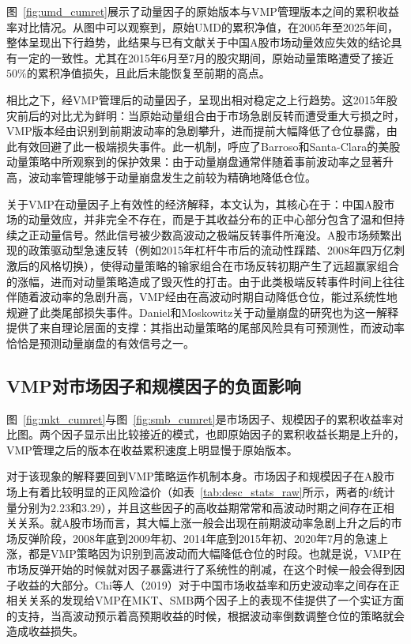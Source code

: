 \documentclass[
    decl-page,
    oneside,
  ]{njuthesis}
\begin{document}
图~\ref{fig:umd_cumret}展示了动量因子的原始版本与VMP管理版本之间的累积收益率对比情况。从图中可以观察到，原始UMD的累积净值，在2005年至2025年间，整体呈现出下行趋势，此结果与已有文献关于中国A股市场动量效应失效的结论具有一定的一致性。尤其在2015年6月至7月的股灾期间，原始动量策略遭受了接近$50\%$的累积净值损失，且此后未能恢复至前期的高点。

相比之下，经VMP管理后的动量因子，呈现出相对稳定之上行趋势。这2015年股灾前后的对比尤为鲜明：当原始动量组合由于市场急剧反转而遭受重大亏损之时，VMP版本经由识别到前期波动率的急剧攀升，进而提前大幅降低了仓位暴露，由此有效回避了此一极端损失事件。此一机制，呼应了Barroso和Santa-Clara\cite{barroso2015momentum}的美股动量策略中所观察到的保护效果：由于动量崩盘通常伴随着事前波动率之显著升高，波动率管理能够于动量崩盘发生之前较为精确地降低仓位。

关于VMP在动量因子上有效性的经济解释，本文认为，其核心在于：中国A股市场的动量效应，并非完全不存在，而是于其收益分布的正中心部分包含了温和但持续之正动量信号。然此信号被少数高波动之极端反转事件所淹没。A股市场频繁出现的政策驱动型急速反转（例如2015年杠杆牛市后的流动性踩踏、2008年四万亿刺激后的风格切换），使得动量策略的输家组合在市场反转初期产生了远超赢家组合的涨幅，进而对动量策略造成了毁灭性的打击。由于此类极端反转事件时间上往往伴随着波动率的急剧升高，VMP经由在高波动时期自动降低仓位，能过系统性地规避了此类尾部损失事件。Daniel和Moskowitz\cite{daniel2016momentum}关于动量崩盘的研究也为这一解释提供了来自理论层面的支撑：其指出动量策略的尾部风险具有可预测性，而波动率恰恰是预测动量崩盘的有效信号之一。

\subsection{VMP对市场因子和规模因子的负面影响}

图~\ref{fig:mkt_cumret}与图~\ref{fig:smb_cumret}是市场因子、规模因子的累积收益率对比图。两个因子显示出比较接近的模式，也即原始因子的累积收益长期是上升的，VMP管理之后的版本在收益累积速度上明显慢于原始版本。

对于该现象的解释要回到VMP策略运作机制本身。市场因子和规模因子在A股市场上有着比较明显的正风险溢价（如表~\ref{tab:desc_stats_raw}所示，两者的$t$统计量分别为$2.23$和$3.29$），并且这些因子的高收益期常常和高波动时期之间存在正相关关系。就A股市场而言，其大幅上涨一般会出现在前期波动率急剧上升之后的市场反弹阶段，2008年底到2009年初、2014年底到2015年初、2020年7月的急速上涨，都是VMP策略因为识别到高波动而大幅降低仓位的时段。也就是说，VMP在市场反弹开始的时候就对因子暴露进行了系统性的削减，在这个时候一般会得到因子收益的大部分。Chi等人（2019）对于中国市场收益率和历史波动率之间存在正相关关系的发现给VMP在MKT、SMB两个因子上的表现不佳提供了一个实证方面的支持，当高波动预示着高预期收益的时候，根据波动率倒数调整仓位的策略就会造成收益损失。
\end{document}

